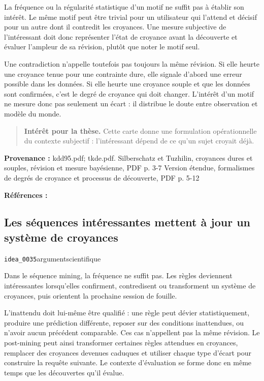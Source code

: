 \documentclass[10pt,a4paper]{article}
\begin{document}
La fréquence ou la régularité statistique d'un motif ne suffit pas à établir son intérêt. Le même motif peut être trivial pour un utilisateur qui l'attend et décisif pour un autre dont il contredit les croyances. Une mesure subjective de l'intéressant doit donc représenter l'état de croyance avant la découverte et évaluer l'ampleur de sa révision, plutôt que noter le motif seul.

Une contradiction n'appelle toutefois pas toujours la même révision. Si elle heurte une croyance tenue pour une contrainte dure, elle signale d'abord une erreur possible dans les données. Si elle heurte une croyance souple et que les données sont confirmées, c'est le degré de croyance qui doit changer. L'intérêt d'un motif ne mesure donc pas seulement un écart : il distribue le doute entre observation et modèle du monde.

\begin{quote}
\textbf{Intérêt pour la thèse.} Cette carte donne une formulation opérationnelle du contexte subjectif : l'intéressant dépend de ce qu'un sujet croyait déjà.
\end{quote}
{\footnotesize\color{metadata}\textbf{Provenance :} kdd95.pdf; tkde.pdf. Silberschatz et Tuzhilin, croyances dures et souples, révision et mesure bayésienne, PDF p. 3-7 Version étendue, formalismes de degrés de croyance et processus de découverte, PDF p. 5-12\par}
{\footnotesize\color{metadata}\textbf{Références :} \parencite{silberschatz1995subjective,silberschatz1996patterns}\par}

\subsection{Les séquences intéressantes mettent à jour un système de croyances}
{\small\color{metadata} \texttt{idea\_0035}\quad\textbullet\quad argument\quad\textbullet\quad scientifique\par}

Dans le séquence mining, la fréquence ne suffit pas. Les règles deviennent intéressantes lorsqu'elles confirment, contredisent ou transforment un système de croyances, puis orientent la prochaine session de fouille.

L'inattendu doit lui-même être qualifié : une règle peut dévier statistiquement, produire une prédiction différente, reposer sur des conditions inattendues, ou n'avoir aucun précédent comparable. Ces cas n'appellent pas la même révision. Le post-mining peut ainsi transformer certaines règles attendues en croyances, remplacer des croyances devenues caduques et utiliser chaque type d'écart pour construire la requête suivante. Le contexte d'évaluation se forme donc en même temps que les découvertes qu'il évalue.
\end{document}
